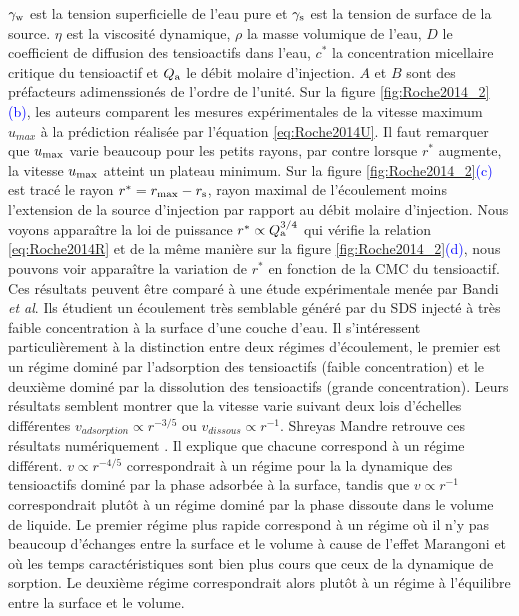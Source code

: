 $\gamma_{\rm w}$ est la tension superficielle de l'eau pure et $\gamma_{\rm s}$ est la tension de surface de la source. $\eta$ est la viscosité dynamique, $\rho$ la masse volumique de l'eau, $D$ le coefficient de diffusion des tensioactifs dans l'eau, $c^{*}$ la concentration micellaire critique du tensioactif et $Q_{\rm a}$ le débit molaire d'injection. $A$ et $B$ sont des préfacteurs adimenssionés de l'ordre de l'unité. Sur la figure \ref{fig:Roche2014_2}\textcolor{blue}{(b)}, les auteurs comparent les mesures expérimentales de la vitesse maximum $u_{max}$ à la prédiction réalisée par l'équation \eqref{eq:Roche2014U}. Il faut remarquer que $u_{\rm max}$ varie beaucoup pour les petits rayons, par contre lorsque $r^{*}$ augmente, la vitesse $u_{\rm max}$ atteint un plateau minimum. Sur la figure \ref{fig:Roche2014_2}\textcolor{blue}{(c)} est tracé le rayon $r^{*} = r_{\rm max}-r_{\rm s}$, rayon maximal de l'écoulement moins l'extension de la source d'injection par rapport au débit molaire d'injection. Nous voyons apparaître la loi de puissance $r^{*}\propto Q_{\rm a} ^{3/4}$ qui vérifie la relation \eqref{eq:Roche2014R} et de la même manière sur la figure \ref{fig:Roche2014_2}\textcolor{blue}{(d)}, nous pouvons voir apparaître la variation de $r^{*}$ en fonction de la CMC du tensioactif.\\[.3cm]

Ces résultats peuvent être comparé à une étude expérimentale menée par Bandi \textit{et al}\cite{Bandi2017}. Ils étudient un écoulement très semblable généré par du SDS injecté à très faible concentration à la surface d'une couche d'eau. Il s'intéressent particulièrement
à la distinction entre deux régimes d'écoulement, le premier est un régime dominé par l'adsorption des tensioactifs (faible concentration) et le deuxième dominé par la dissolution des tensioactifs (grande concentration). Leurs résultats semblent montrer que la vitesse varie suivant deux lois d'échelles différentes $v_{adsorption}\propto r^{-3/5}$ ou $v_{dissous}\propto r^{-1}$. Shreyas Mandre retrouve ces résultats numériquement \cite{Mandre2017}. Il explique que chacune correspond à un régime différent.  $v\propto r^{-4/5}$ correspondrait à un régime pour la la dynamique des tensioactifs dominé par la phase adsorbée à la surface, tandis que $v\propto r^{-1}$ correspondrait plutôt à un régime dominé par la phase dissoute dans le volume de liquide. Le premier régime plus rapide correspond à un régime où il n'y pas beaucoup d'échanges entre la surface et le volume à  cause de l'effet Marangoni et où les temps caractéristiques sont bien plus cours que ceux de la dynamique de sorption. Le deuxième régime correspondrait alors plutôt à un régime à l'équilibre entre la surface et le volume.\\[.3cm]


